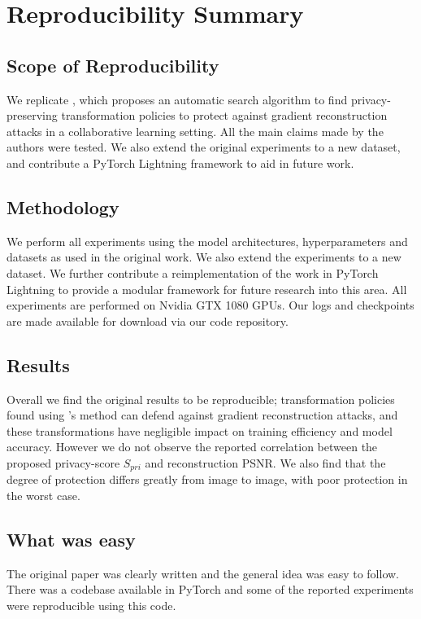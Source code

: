 \section{Reproducibility Summary}
\subsection{Scope of Reproducibility}
We replicate \citet{gao2021privacy}, which proposes an automatic search algorithm to find privacy-preserving transformation policies to protect against gradient reconstruction attacks in a collaborative learning setting. All the main claims made by the authors were tested. We also extend the original experiments to a new dataset, and contribute a PyTorch Lightning framework to aid in future work.

\subsection{Methodology}
We perform all experiments using the model architectures, hyperparameters and datasets as used in the original work. We also extend the experiments to a new dataset. We further contribute a reimplementation of the work in PyTorch Lightning to provide a modular framework for future research into this area. All experiments are performed on Nvidia GTX 1080 GPUs. Our logs and checkpoints are made available for download via our code repository.

\subsection{Results}
Overall we find the original results to be reproducible; transformation policies found using \citet{gao2021privacy}'s method can defend against gradient reconstruction attacks, and these transformations have negligible impact on training efficiency and model accuracy. However we do not observe the reported correlation between the proposed privacy-score $S_{pri}$ and reconstruction PSNR. We also find that the degree of protection differs greatly from image to image, with poor protection in the worst case.

\subsection{What was easy}

The original paper was clearly written and the general idea was easy to follow. There was a codebase available in PyTorch and some of the reported experiments were reproducible using this code.

